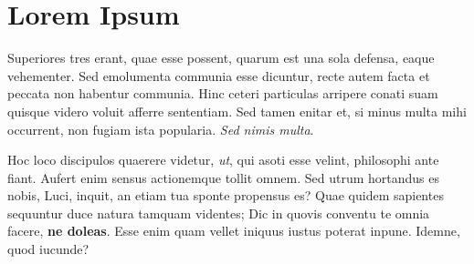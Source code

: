 \section{Lorem Ipsum}\label{lorem-ipsum} \par  Superiores tres erant, quae esse possent, quarum est una sola defensa, eaque vehementer. Sed emolumenta communia esse dicuntur, recte autem facta et peccata non habentur communia. Hinc ceteri particulas arripere conati suam quisque videro voluit afferre sententiam. Sed tamen enitar et, si minus multa mihi occurrent, non fugiam ista popularia. \emph{Sed nimis multa}. \par  Hoc loco discipulos quaerere videtur, \emph{ut}, qui asoti esse velint, philosophi ante fiant. Aufert enim sensus actionemque tollit omnem. Sed utrum hortandus es nobis, Luci, inquit, an etiam tua sponte propensus es? Quae quidem sapientes sequuntur duce natura tamquam videntes; Dic in quovis conventu te omnia facere, \textbf{ne doleas}. Esse enim quam vellet iniquus iustus poterat inpune. Idemne, quod iucunde? 